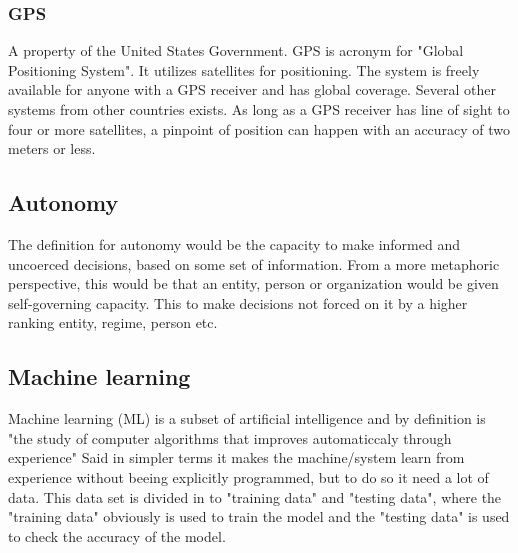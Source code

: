 \documentclass[conference]{IEEEtran}
\begin{document}
	 \subsubsection{GPS}
		 A property of the United States Government. GPS is acronym for "Global Positioning System".
		 It utilizes satellites for positioning. The system is freely available for anyone with a GPS
		 receiver and has global coverage. Several other systems from other countries exists.
		 As long as a GPS receiver has line of sight to four or more satellites, a pinpoint of
		 position can happen with an accuracy of two meters or less.

 \subsection{Autonomy}
	 The definition for autonomy would be the capacity to make informed and uncoerced decisions,
	 based on some set of information. From a more metaphoric perspective, this would be that
	 an entity, person or organization would be given self-governing capacity. This to make
	 decisions not forced on it by a higher ranking entity, regime, person etc.

 \subsection{Machine learning}
	 Machine learning (ML) is a subset of artificial intelligence and by definition is "the study of
	 computer algorithms that improves automaticcaly through experience"
	 Said in simpler terms it makes the machine/system learn from experience without beeing explicitly
	 programmed, but to do so it need a lot of data. This data set is divided in to "training data" and
	 "testing data", where the "training data" obviously is used to train the model and the "testing data"
	 is used to check the accuracy of the model.
\end{document}
